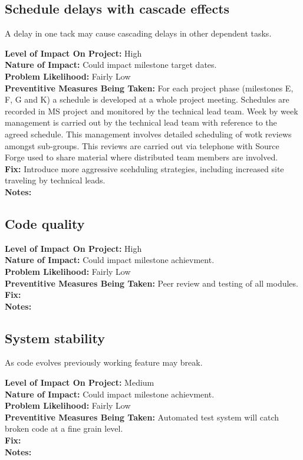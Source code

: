 \documentclass[english]{article}
\newcommand{\sreq}[1]{\subsection{\hspace{.2in}#1}}
\newenvironment
{reqlist}
{\begin{list} {} {} \rm \item[]}
{\end{list}}
\begin{document}
\sreq{Schedule delays with cascade effects}
A delay in one tack may cause cascading delays in other dependent tasks.
\begin{reqlist}
{\bf Level of Impact On Project:} High \\
{\bf Nature of Impact:} Could impact milestone target dates.\\
{\bf Problem Likelihood:} Fairly Low \\
{\bf Preventitive Measures Being Taken:} For each project phase
(milestones E, F, G and K) a schedule is developed at a whole project meeting. 
Schedules are recorded in MS project and monitored by the technical lead team.
Week by week management is carried out by the technical lead team with reference to the
agreed schedule. This management involves detailed scheduling of
wotk reviews amongst sub-groups. This reviews are carried out via telephone
with Source Forge used to share material where distributed team members are
involved.  \\
{\bf Fix:} Introduce more aggressive scehduling strategies, including
increased site traveling by technical leads.\\
{\bf Notes:} 
\end{reqlist}

\sreq{Code quality}
\begin{reqlist}
{\bf Level of Impact On Project:} High \\
{\bf Nature of Impact:} Could impact milestone achievment.\\
{\bf Problem Likelihood:} Fairly Low \\
{\bf Preventitive Measures Being Taken:} Peer review and testing of all modules.
\\
{\bf Fix:}\\
{\bf Notes:} 
\end{reqlist}

\sreq{System stability}
As code evolves previously working feature may break.
\begin{reqlist}
{\bf Level of Impact On Project:} Medium \\
{\bf Nature of Impact:} Could impact milestone achievment.\\
{\bf Problem Likelihood:} Fairly Low \\
{\bf Preventitive Measures Being Taken:} Automated test system will catch 
broken code at a fine grain level.
\\
{\bf Fix:}\\
{\bf Notes:} 
\end{reqlist}
\end{document}
